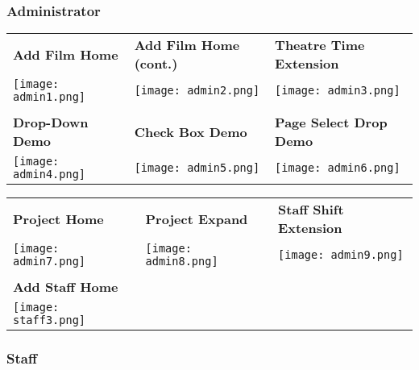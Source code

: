 \documentclass[11pt, english]{article}
\begin{document}
\newpage

		\subsubsection{Administrator}

	\begin{center}
        	\scriptsize
        \begin{longtable}{p{5cm}p{5cm}p{5cm}}
		\textbf{Add Film Home} & \textbf{Add Film Home (cont.)} & \textbf{Theatre Time Extension}\\
		\texttt{[image: admin1.png]} & \texttt{[image: admin2.png]} & \texttt{[image: admin3.png]}\\
		& \\
                \textbf{Drop-Down Demo} & \textbf{Check Box Demo} & \textbf{Page Select Drop Demo}\\
		\texttt{[image: admin4.png]} & \texttt{[image: admin5.png]} & \texttt{[image: admin6.png]}\\
        \end{longtable}
        \end{center}

\newpage

	\begin{center}
        	\scriptsize
        \begin{longtable}{p{5cm}p{5cm}p{5cm}}
                \textbf{Project Home} & \textbf{Project Expand} & \textbf{Staff Shift Extension}\\
		\texttt{[image: admin7.png]} & \texttt{[image: admin8.png]} & \texttt{[image: admin9.png]}\\
		& \\
                \textbf{Add Staff Home}\\
		\texttt{[image: staff3.png]}\\
        \end{longtable}
        \end{center}

\newpage

		\subsubsection{Staff}
		
\end{document}
